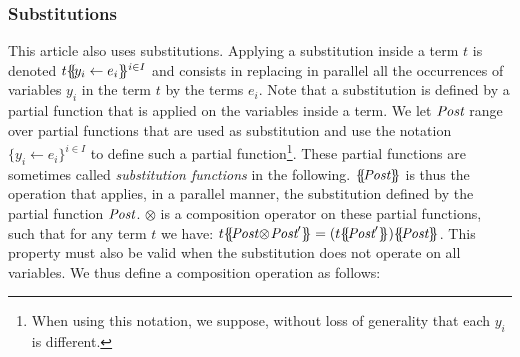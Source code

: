 \documentclass{lmcs}
\newcommand{\TODO}[1]{\textcolor{red}{\textbf{[TODO:#1]}}}
\newcommand{\ERIC}[1]{\textcolor{blue}{#1}}
\newcommand{\shortotimes}{\!\otimes\!}
\begin{document}
\subsubsection*{Substitutions}
\label{def:substitutions}

This article also uses substitutions. Applying a substitution inside a term $t$ is denoted $t\{\hspace{-0.68ex}\{\!y_i\gets e_i\}\hspace{-0.67ex}\}^{i\in I}$ and consists in replacing in parallel all the occurrences of variables $y_i$ in the term $t$ by the terms $e_i$. Note that a substitution is defined by a partial function that is applied on the variables inside a term. We let $\Post$ range over partial functions that are used as substitution and use the notation $\{y_i\gets e_i\}^{i\in I}$ to define such a partial function\footnote{When using this notation, we suppose, without loss of generality that each $y_i$ is different.}. These partial functions are sometimes called \emph{substitution functions} in the following.
 $\subst{\Post}$ is thus the operation that applies,  in a parallel manner,  the substitution defined by the partial function $\Post$. $\otimes$ is a composition operator on these partial functions, such that for any term $t$ we have: $t\subst{\Post\shortotimes\Post'} = (t\subst{\Post'})\subst{\Post}$.
This property must also be valid when the substitution does not operate on all variables.
We thus define a composition operation as follows: 
%
\end{document}
